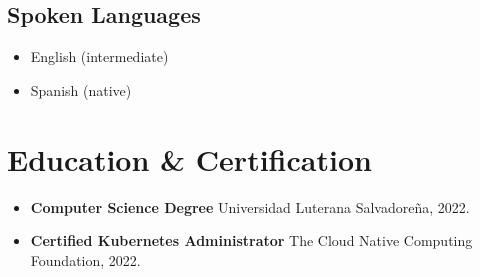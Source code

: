 \documentclass[letterpaper]{article}
\begin{document}
\subsection{Spoken Languages}

\begin{itemize}
	\item English (intermediate)
	\item Spanish (native)
\end{itemize}

\section{Education \& Certification}

\begin{itemize}
	\item \textbf{Computer Science Degree} \newline Universidad Luterana Salvadoreña, 2022.

	\item \textbf{Certified Kubernetes Administrator} \newline The Cloud Native Computing Foundation, 2022.
\end{itemize}
\end{document}
